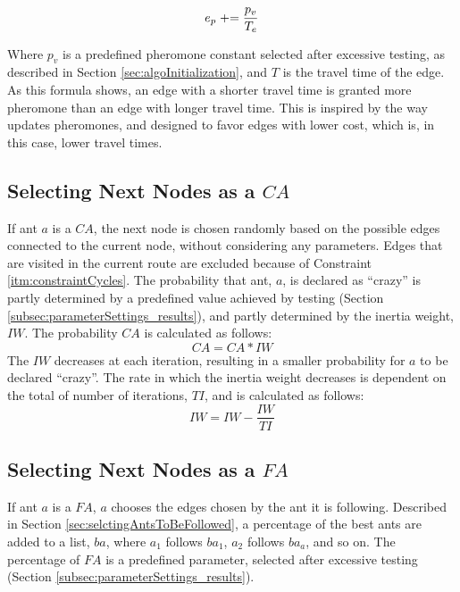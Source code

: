 $$e_p \mathrel{+}= \frac{p_v}{T_e}$$ 

Where $p_v$ is a predefined pheromone constant selected after excessive testing, as described in Section \vref{sec:algoInitialization}, and $T$ is the travel time of the edge. As this formula shows, an edge with a shorter travel time is granted more pheromone than an edge with longer travel time. This is inspired by the way \citet{hsiao04} updates pheromones, and designed to favor edges with lower cost, which is, in this case, lower travel times. 

\subsection{Selecting Next Nodes as a $CA$}
If ant $a$ is a $CA$, the next node is chosen randomly based on the possible edges connected to the current node, without considering any parameters. Edges that are visited in the current route are excluded because of Constraint \vref{itm:constraintCycles}. The probability that ant, $a$, is declared as ``crazy'' is partly determined by a predefined value achieved by testing (Section \vref{subsec:parameterSettings_results}), and partly determined by the inertia weight, $IW$. The probability $CA$ is calculated as follows:
$$CA = CA*IW$$
The $IW$ decreases at each iteration, resulting in a smaller probability for $a$ to be declared ``crazy''. The rate in which the inertia weight decreases is dependent on the total of number of iterations, $TI$, and is calculated as follows:
$$IW = IW - \frac{IW}{TI}$$

\subsection{Selecting Next Nodes as a $FA$}
If ant $a$ is a $FA$, $a$ chooses the edges chosen by the ant it is following. Described in Section \vref{sec:selctingAntsToBeFollowed}, a percentage of the best ants are added to a list, $ba$, where $a_1$ follows $ba_1$, $a_2$ follows $ba_a$, and so on. The percentage of $FA$ is a predefined parameter, selected after excessive testing (Section \vref{subsec:parameterSettings_results}).